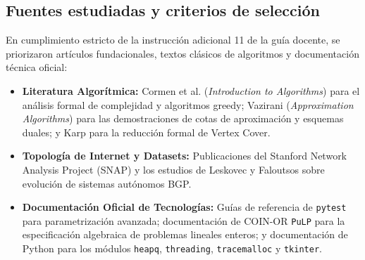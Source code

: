 \documentclass[11pt,a4paper]{article}
\begin{document}
\subsection{Fuentes estudiadas y criterios de selección}
En cumplimiento estricto de la instrucción adicional 11 de la guía docente, se priorizaron artículos fundacionales, textos clásicos de algoritmos y documentación técnica oficial:
\begin{itemize}[itemsep=2pt]
	\item \textbf{Literatura Algorítmica:} Cormen et al. (\textit{Introduction to Algorithms}) \cite{clrs2009} para el análisis formal de complejidad y algoritmos greedy; Vazirani (\textit{Approximation Algorithms}) \cite{vazirani2003} para las demostraciones de cotas de aproximación y esquemas duales; y Karp \cite{karp1972} para la reducción formal de Vertex Cover.
	\item \textbf{Topología de Internet y Datasets:} Publicaciones del Stanford Network Analysis Project (SNAP) \cite{snap-as733, snap-caida} y los estudios de Leskovec y Faloutsos sobre evolución de sistemas autónomos BGP.
	\item \textbf{Documentación Oficial de Tecnologías:} Guías de referencia de \texttt{pytest} para parametrización avanzada; documentación de COIN-OR \texttt{PuLP} para la especificación algebraica de problemas lineales enteros; y documentación de Python para los módulos \texttt{heapq}, \texttt{threading}, \texttt{tracemalloc} y \texttt{tkinter}.
\end{itemize}
\end{document}
